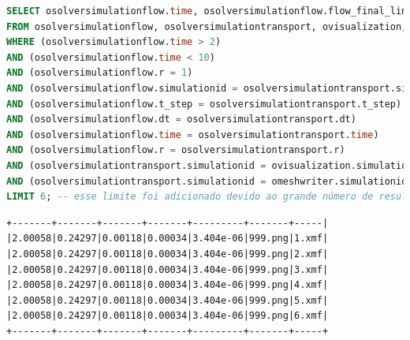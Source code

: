 \begin{lstlisting}[language=sql,deletendkeywords={TIME},label={lst:experiments-3b-sql},caption={[Código em SQL gerado na consulta~\#3B]Código em SQL gerado na consulta~\#3B (tempo médio: 34,36~ms).}]
SELECT osolversimulationflow.time, osolversimulationflow.flow_final_linear_residual, osolversimulationflow.flow_norm_delta_u, osolversimulationtransport.transport_final_linear_residual, osolversimulationtransport.transport_norm_delta_u, ovisualization.png, omeshwriter.xdmf
FROM osolversimulationflow, osolversimulationtransport, ovisualization, omeshwriter
WHERE (osolversimulationflow.time > 2) 
AND (osolversimulationflow.time < 10) 
AND (osolversimulationflow.r = 1) 
AND (osolversimulationflow.simulationid = osolversimulationtransport.simulationid) 
AND (osolversimulationflow.t_step = osolversimulationtransport.t_step) 
AND (osolversimulationflow.dt = osolversimulationtransport.dt) 
AND (osolversimulationflow.time = osolversimulationtransport.time) 
AND (osolversimulationflow.r = osolversimulationtransport.r) 
AND (osolversimulationtransport.simulationid = ovisualization.simulationid) 
AND (osolversimulationtransport.simulationid = omeshwriter.simulationid)
LIMIT 6; -- esse limite foi adicionado devido ao grande número de resultados dessa consulta
\end{lstlisting}

\begin{lstlisting}[language=sqlresults,label={lst:experiments-3b-sqlresults},caption={[Versão simplificada dos resultados da consulta \#3B.]Resultados da consulta \#3B (6 tuplas, tempo médio: 19,85~ms).}]
+-------+-------+-------+-------+---------+-------+-----|
|2.00058|0.24297|0.00118|0.00034|3.404e-06|999.png|1.xmf|
|2.00058|0.24297|0.00118|0.00034|3.404e-06|999.png|2.xmf|
|2.00058|0.24297|0.00118|0.00034|3.404e-06|999.png|3.xmf|
|2.00058|0.24297|0.00118|0.00034|3.404e-06|999.png|4.xmf|
|2.00058|0.24297|0.00118|0.00034|3.404e-06|999.png|5.xmf|
|2.00058|0.24297|0.00118|0.00034|3.404e-06|999.png|6.xmf|
+-------+-------+-------+-------+---------+-------+-----+
\end{lstlisting}

